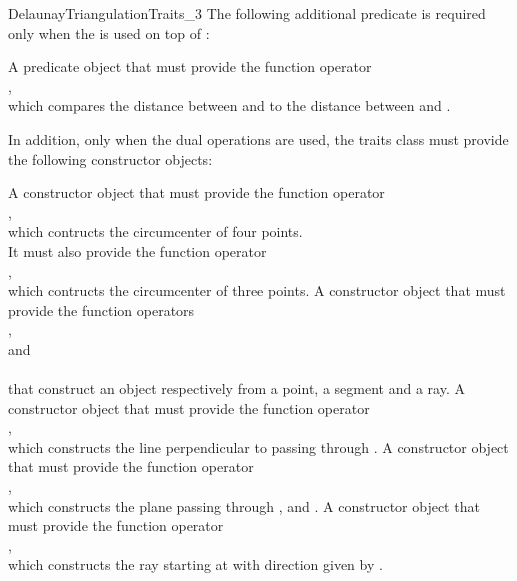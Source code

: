 \begin{ccRefConcept}{DelaunayTriangulationTraits_3}
The following additional predicate is required only when the 
 is used on top of 
: 

{A predicate object that must provide the function operator\\
,\\
which compares the distance between  and  to the distance
between  and .}

In addition, only when the dual operations are used, the traits class
must provide the following constructor objects: 

{A constructor object that must provide the function operator\\
,\\
which contructs the circumcenter of four points.
\\
It must also provide the function operator\\
,\\
which contructs the circumcenter of three points.
}
\ccGlue
{}
{A constructor object that must provide the function operators\\
,\\
 and\\
\\
that construct an object respectively from a point, a segment and a ray.}
\ccGlue
{}
{A constructor object that must provide the function operator\\
,\\
which constructs the line perpendicular to  passing through .}
\ccGlue
{}
{A constructor object that must provide the function operator\\
,\\
which constructs the plane passing through ,  and .
}
\ccGlue
{}
{A constructor object that must provide the function operator\\
,\\
which constructs the ray starting at  with direction given by .}



\end{ccRefConcept}
